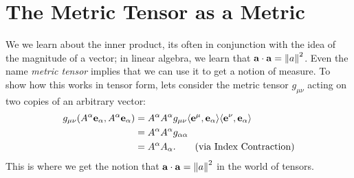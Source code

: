 \section{The Metric Tensor as a Metric}
We we learn about the inner product, its often in conjunction with the idea of the magnitude of a vector; in linear algebra, we learn that $\vb{a}\cdot\vb{a} = \norm{a}^2$.
Even the name \emph{metric tensor} implies that we can use it to get a notion of measure.
To show how this works in tensor form, lets consider the metric tensor $g_{\mu\nu}$ acting on two copies of an arbitrary vector:
\begin{align*}
    g_{\mu\nu}\qty(A^\alpha \vb{e}_\alpha, A^\alpha \vb{e}_\alpha) &= A^\alpha A^\alpha g_{\mu\nu} \langle \vb{e}^\mu, \vb{e}_\alpha \rangle \langle \vb{e}^\nu, \vb{e}_\alpha \rangle \\
    &= A^\alpha A^\alpha g_{\alpha\alpha} \\
    &= A^\alpha A_\alpha. \tag{via Index Contraction}
\end{align*}
This is where we get the notion that $\vb{a}\cdot\vb{a} = \norm{a}^2$ in the world of tensors.
